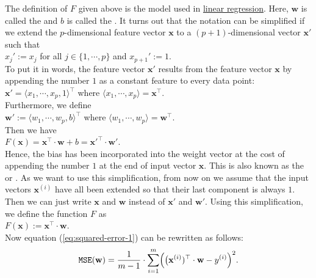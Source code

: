 The definition of $F$ given above is the model used in
\href{https://en.wikipedia.org/wiki/Linear_regression}{linear regression}. 
Here, $\mathbf{w}$ is called the  and $b$ is called the .  It turns
out that the notation can be simplified if we extend the $p$-dimensional feature vector $\mathbf{x}$ to a
$(p+1)$-dimensional vector $\mathbf{x}'$ such that
\\[0.2cm]
\hspace*{1.3cm}
$x_j' := x_j$ \quad for all $j\in\{1,\cdots,p\}$ \quad and \quad $x_{p+1}' := 1$.
\\[0.2cm]
To put it in words, the feature vector $\mathbf{x}'$ results from the feature vector $\mathbf{x}$ by appending
the number $1$ as a constant feature to every data point:
\\[0.2cm]
\hspace*{1.3cm}
$\mathbf{x}' = \langle x_1, \cdots, x_p, 1 \rangle^\top$ \quad where $\langle x_1, \cdots, x_p \rangle = \mathbf{x}^\top$.
\\[0.2cm]
Furthermore, we define 
\\[0.2cm]
\hspace*{1.3cm}
$\mathbf{w}' := \langle w_1, \cdots, w_p, b \rangle^\top$ \quad where $\langle w_1, \cdots, w_p \rangle = \mathbf{w}^\top$.
\\[0.2cm]
Then we have
\\[0.2cm]
\hspace*{1.3cm}
$F(\mathbf{x}) = \mathbf{x}^\top \cdot \mathbf{w} + b = \mathbf{x}'^\top \cdot \mathbf{w}'$.
\\[0.2cm]
Hence, the bias has been incorporated into the weight vector at the cost of appending the number $1$ at the end of
input vector $\mathbf{x}$.  This is also known as the  or
.  As we want to use this simplification, from now on we assume that
the input vectors $\mathbf{x}^{(i)}$ have all been extended so that their last component is always $1$.  Then we can just write
$\mathbf{x}$ and $\mathbf{w}$ instead of $\mathbf{x}'$ and $\mathbf{w}'$.  Using this simplification,  we define the
function $F$ as
\\[0.2cm]
\hspace*{1.3cm}
$F(\mathbf{x}) := \mathbf{x}^\top \cdot \mathbf{w}$.
\\[0.2cm]
Now equation (\ref{eq:squared-error-1}) can be rewritten as follows:
\begin{equation}
  \label{eq:squared-error-2}
  \mathtt{MSE}(\mathbf{w}) = \frac{1}{m-1} \cdot \sum\limits_{i=1}^m \Bigl(\bigl(\mathbf{x}^{(i)})^\top \cdot \mathbf{w}  - y^{(i)}\Bigr)^2.
\end{equation}
